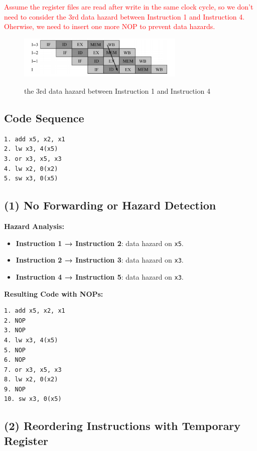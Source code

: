 \documentclass[cn,12pt]{homework}
\begin{document}
\begin{solution}
\textcolor{red}{Assume the register files are read after write in the same clock cycle, so we don't need to consider the 3rd data hazard between
 Instruction 1 and Instruction 4.
 Oherwise, we need to insert one more NOP to prevent data hazards.}


  \begin{figure}[H]
    \centering
    \includegraphics[width=0.71\textwidth]{./figures/forward3.png}
    \label{fig:pro1}
    \caption{the 3rd data hazard between Instruction 1 and Instruction 4}
  \end{figure}

\subsection*{Code Sequence}
\begin{verbatim}
1. add x5, x2, x1
2. lw x3, 4(x5)
3. or x3, x5, x3
4. lw x2, 0(x2)
5. sw x3, 0(x5)
\end{verbatim}

\subsection*{(1) No Forwarding or Hazard Detection}

\textbf{Hazard Analysis:}
\begin{itemize}
    \item \textbf{Instruction 1 → Instruction 2}: data hazard on \texttt{x5}.
    \item \textbf{Instruction 2 → Instruction 3}: data hazard on \texttt{x3}.
    \item \textbf{Instruction 4 → Instruction 5}: data hazard on \texttt{x3}.
\end{itemize}

\textbf{Resulting Code with NOPs:}
\begin{verbatim}
1. add x5, x2, x1
2. NOP
3. NOP
4. lw x3, 4(x5)
5. NOP
6. NOP
7. or x3, x5, x3
8. lw x2, 0(x2)
9. NOP
10. sw x3, 0(x5)
\end{verbatim}

\subsection*{(2) Reordering Instructions with Temporary Register}



\end{solution}
\end{document}
